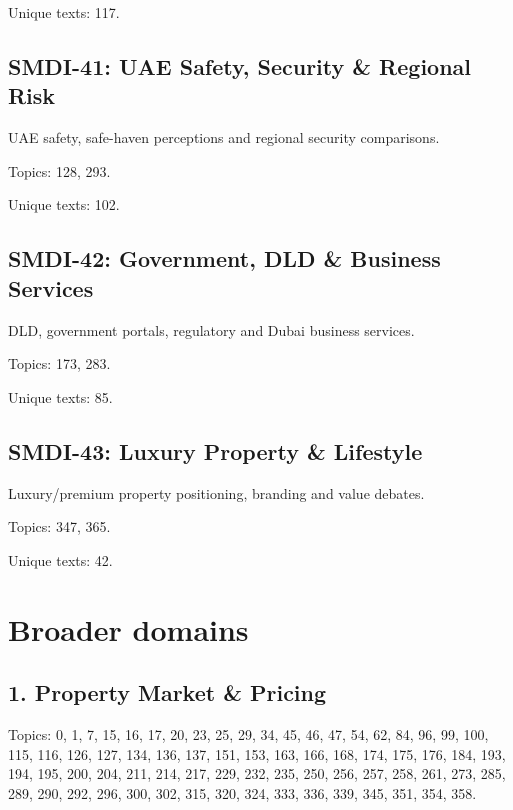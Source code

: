 \documentclass[10pt]{article}
\begin{document}
\par Unique texts: 117.

\subsection*{SMDI-41: UAE Safety, Security \& Regional Risk}

UAE safety, safe-haven perceptions and regional security comparisons.

\par Topics: 128, 293.

\par Unique texts: 102.

\subsection*{SMDI-42: Government, DLD \& Business Services}

DLD, government portals, regulatory and Dubai business services.

\par Topics: 173, 283.

\par Unique texts: 85.

\subsection*{SMDI-43: Luxury Property \& Lifestyle}

Luxury/premium property positioning, branding and value debates.

\par Topics: 347, 365.

\par Unique texts: 42.

\section*{Broader domains}

\subsection*{1. Property Market \& Pricing}

Topics: 0, 1, 7, 15, 16, 17, 20, 23, 25, 29, 34, 45, 46, 47, 54, 62, 84, 96, 99, 100, 115, 116, 126, 127, 134, 136, 137, 151, 153, 163, 166, 168, 174, 175, 176, 184, 193, 194, 195, 200, 204, 211, 214, 217, 229, 232, 235, 250, 256, 257, 258, 261, 273, 285, 289, 290, 292, 296, 300, 302, 315, 320, 324, 333, 336, 339, 345, 351, 354, 358.
\end{document}
